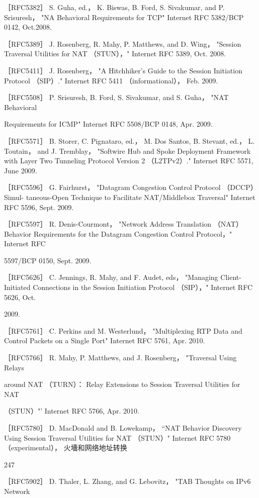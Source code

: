 ［RFC5382］ S. Guha, ed.， K. Biswas, B. Ford, S. Sivakumar, and P. Srisuresh， "NA
Behavioral Requirements for TCP" Internet RFC 5382/BCP 0142, Oct.2008.

［RFC5389］ J. Rosenberg, R. Mahy, P. Matthews, and D. Wing， "Session Traversal
Utilities for NAT （STUN），" Internet RFC 5389, Oct. 2008.

［RFC5411］ J. Rosenberg， "A Hitchhiker's Guide to the Session Initiation Protocol
（SIP）." Internet RFC 5411 （informational）， Feb. 2009.

［RFC5508］ P. Srisuresh, B. Ford, S. Sivakumar, and S. Guha， "NAT Behavioral

Requirements for ICMP" Internet RFC 5508/BCP 0148, Apr. 2009.

［RFC5571］ B. Storer, C. Pignataro, ed.， M. Dos Santos, B. Stevant, ed.， L. Toutain，
and J. Tremblay， "Softwire Hub and Spoke Deployment Framework with Layer
Two Tunneling Protocol Version 2 （L2TPv2）." Internet RFC 5571, June 2009.

［RFC5596］ G. Fairhurst， "Datagram Congestion Control Protocol （DCCP） Simul-
taneous-Open Technique to Facilitate NAT/Middlebox Traversal" Internet RFC
5596, Sept. 2009.

［RFC5597］ R. Denis-Courmont， "Network Address Translation （NAT） Behavior
Requirements for the Datagram Congestion Control Protocol，" Internet RFC

5597/BCP 0150, Sept. 2009.

［RFC5626］ C. Jennings, R. Mahy, and F. Audet, eds， "Managing Client-Initiated
Connections in the Session Initiation Protocol （SIP），" Internet RFC 5626, Oct.

2009.

［RFC5761］ C. Perkins and M. Westerlund， "Multiplexing RTP Data and Control
Packets on a Single Port" Internet RFC 5761, Apr. 2010.

［RFC5766］ R. Mahy, P. Matthews, and J. Rosenberg， "Traversal Using Relays

around NAT （TURN）： Relay Extensions to Session Traversal Utilities for NAT

（STUN）"' Internet RFC 5766, Apr. 2010.

［RFC5780］ D. MacDonald and B. Lowekamp， “NAT Behavior Discovery Using
Session Traversal Utilities for NAT （STUN）" Internet RFC 5780 （experimental），
火墻和网络地址转换

247

［RFC5902］ D. Thaler, L. Zhang, and G. Lebovitz， "TAB Thoughts on IPv6 Network

